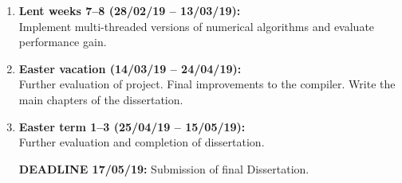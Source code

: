 \documentclass[12pt,a4paper,twoside]{article}
\begin{document}
\begin{enumerate}
		\item \textbf{Lent weeks 7--8 (28/02/19 -- 13/03/19):} \\
		Implement multi-threaded versions of numerical algorithms and
		evaluate performance gain.
		
		\item \textbf{Easter vacation (14/03/19 -- 24/04/19):} \\
		Further evaluation of project. Final improvements to the compiler.
		Write the main chapters of the dissertation.
		
		\item \textbf{Easter term 1--3 (25/04/19 -- 15/05/19):}  \\
		Further evaluation and completion of dissertation.
		
		\textbf{DEADLINE 17/05/19:} Submission of final Dissertation. \\
		
	\end{enumerate}
	
\end{document}
